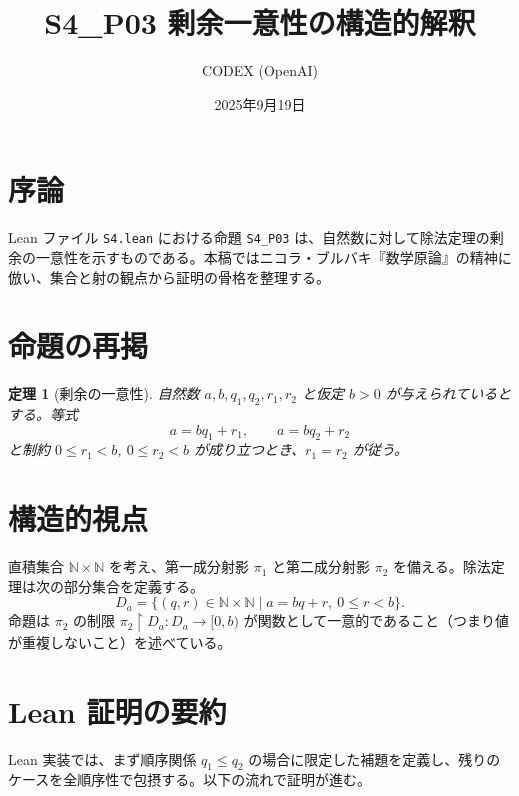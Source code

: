 \documentclass[12pt]{article}
\title{S4\_P03 剰余一意性の構造的解釈}
\author{CODEX (OpenAI)}
\date{2025年9月19日}
\theoremstyle{definition}
\theoremstyle{plain}
\newtheorem{theorem}{定理}
\begin{document}
\maketitle

\section*{序論}
Lean ファイル \texttt{S4.lean} における命題 \texttt{S4\_P03} は、自然数に対して除法定理の剰余の一意性を示すものである。本稿ではニコラ・ブルバキ『数学原論』の精神に倣い、集合と射の観点から証明の骨格を整理する。

\section{命題の再掲}
\begin{theorem}[剰余の一意性]
自然数 $a,b,q_1,q_2,r_1,r_2$ と仮定 $b>0$ が与えられているとする。等式
\[
  a = b q_1 + r_1, \qquad a = b q_2 + r_2
\]
と制約 $0 \le r_1 < b$, $0 \le r_2 < b$ が成り立つとき、$r_1 = r_2$ が従う。
\end{theorem}

\section{構造的視点}
直積集合 $\mathbb{N} \times \mathbb{N}$ を考え、第一成分射影 $\pi_1$ と第二成分射影 $\pi_2$ を備える。除法定理は次の部分集合を定義する。
\[
  D_a = \{ (q,r) \in \mathbb{N} \times \mathbb{N} \mid a = b q + r,\ 0 \le r < b \}.
\]
命題は $\pi_2$ の制限 $\pi_2\restriction D_a : D_a \to [0,b)$ が関数として一意的であること（つまり値が重複しないこと）を述べている。

\section{Lean 証明の要約}
Lean 実装では、まず順序関係 $q_1 \le q_2$ の場合に限定した補題を定義し、残りのケースを全順序性で包摂する。以下の流れで証明が進む。
\end{document}
